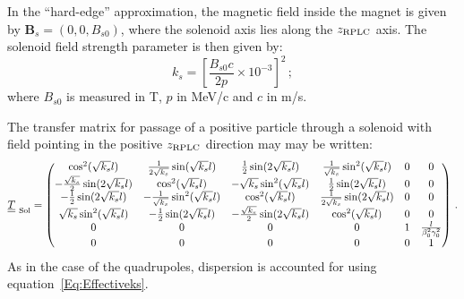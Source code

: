 In the ``hard-edge'' approximation, the magnetic field inside the
magnet is given by $\bm{B}_s = (0, 0, B_{s0})$, where the solenoid axis
lies along the $z_{\rm RPLC}$ axis.
The solenoid field strength parameter is then given by:
\begin{equation}
  k_s = \left[ \frac{B_{s0} c}{2p} \times 10^{-3} \right]^2\,; \label{Eq:Effectiveks}
\end{equation}
where $B_{s0}$ is measured in T, $p$ in MeV/c and $c$ in m/s.

The transfer matrix for passage of a positive particle through a
solenoid with field pointing in the positive $z_{\rm RPLC}$ direction
may may be written: 
\begin{equation}
  \underline{\underline{T}}_{\rm~Sol} =
    \begin{pmatrix}
                             \cos^2(\sqrt{k_s} l) &   \frac{1}{2\sqrt{k_s}} \sin(\sqrt{k_s} l) &         \frac{1}{2} \sin(2\sqrt{k_s} l) & \frac{1}{\sqrt{k_s}} \sin^2(\sqrt{k_s} l) & 0 & 0 \\
          -\frac{\sqrt{k_s}}{2} \sin(2\sqrt{k_s} l) &                     \cos^2(\sqrt{k_s} l) &           -\sqrt{k_s}\sin^2(\sqrt{k_s} l) &         \frac{1}{2} \sin(2\sqrt{k_s} l) & 0 & 0 \\
                 -\frac{1}{2} \sin(2\sqrt{k_s} l) & -\frac{1}{\sqrt{k_s}} \sin^2(\sqrt{k_s} l) &                    \cos^2(\sqrt{k_s} l) & \frac{1}{2\sqrt{k_s}} \sin(2\sqrt{k_s} l) & 0 & 0 \\
                    \sqrt{k_s} \sin^2(\sqrt{k_s} l) &         -\frac{1}{2} \sin(2\sqrt{k_s} l) & -\frac{\sqrt{k_s}}{2} \sin(2\sqrt{k_s} l) &                    \cos^2(\sqrt{k_s} l) & 0 & 0 \\
          0 & 0 & 0 & 0 & 1 & \frac{l}{\beta_0^2 \gamma_0^2} \\
          0 & 0 & 0 & 0 & 0 &                             1
        \end{pmatrix} \, .
\end{equation}
As in the case of the quadrupoles, dispersion is accounted for using
equation~\ref{Eq:Effectiveks}.
